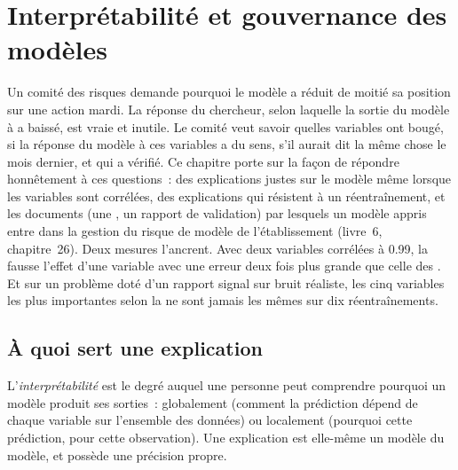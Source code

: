 \chapter{Interprétabilité et gouvernance des modèles}\label{ch:ml:interpretability-and-model-governance}

Un comité des risques demande pourquoi le modèle a réduit de moitié sa position sur une action mardi. La réponse du chercheur, selon laquelle la
sortie du modèle à  a baissé, est vraie et inutile. Le comité veut savoir quelles variables ont bougé, si la
réponse du modèle à ces variables a du sens, s'il aurait dit la même chose le mois dernier, et qui a vérifié. Ce chapitre porte sur
la façon de répondre honnêtement à ces questions~: des explications justes sur le modèle même lorsque les variables sont corrélées,
des explications qui résistent à un réentraînement, et les documents (une , un rapport de validation) par lesquels un modèle appris
entre dans la gestion du risque de modèle de l'établissement (livre~6, chapitre~26). Deux mesures l'ancrent. Avec deux variables corrélées à
0.99, la  fausse l'effet d'une variable avec une erreur deux fois plus grande que celle des . Et sur un problème
doté d'un rapport signal sur bruit réaliste, les cinq variables les plus importantes selon la  ne sont jamais les mêmes sur dix réentraînements.

\section{À quoi sert une explication}

\begin{definition}[Interprétabilité]\label{def:ml:interpretability-and-model-governance:interp}
L'\emph{interprétabilité} est le degré auquel une personne peut comprendre pourquoi un modèle produit ses
sorties~: globalement (comment la prédiction dépend de chaque variable sur l'ensemble des données) ou localement (pourquoi cette prédiction, pour cette
observation). Une explication est elle-même un modèle du modèle, et possède une précision propre.
\end{definition}

